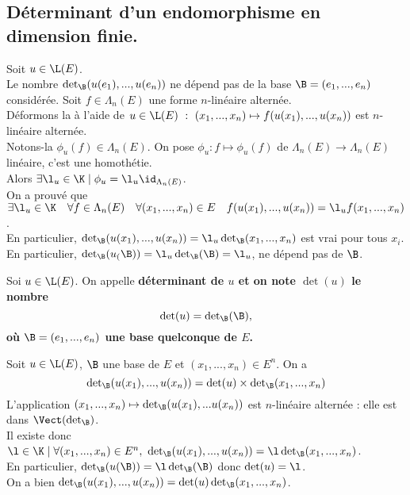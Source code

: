 \documentclass[11pt]{article}
\begin{document}
\subsection{Déterminant d'un endomorphisme en dimension finie.}

\begin{lemme}{}{}
    Soit $u\in\L(E)$.\\
    Le nombre $\det_\B(u(e_1),...,u(e_n))$ ne dépend pas de la base $\B=(e_1,...,e_n)$ considérée.
    \tcblower
    Soit $f\in\Lambda_n(E)$ une forme $n$-linéaire alternée.\\
    Déformons la à l'aide de $u\in\L(E)~:~(x_1,...,x_n)\mapsto f(u(x_1),...,u(x_n))$ est $n$-linéaire alternée.\\
    Notons-la $\phi_u(f)\in\Lambda_n(E)$. On pose $\phi_u:f\mapsto\phi_u(f)$ de $\Lambda_n(E) \to \Lambda_n(E)$ linéaire, c'est une homothétie.\\
    Alors $\exists \l_u\in\K\mid\phi_u=\l_u\id_{\Lambda_n(E)}$.\\
    On a prouvé que $\exists \l_u\in\K \quad \forall f \in \Lambda_n(E) \quad \forall (x_1,...,x_n)\in E \quad f(u(x_1),...,u(x_n))=\l_u f(x_1,...,x_n)$.\\
    En particulier, $\det_\B(u(x_1),...,u(x_n))=\l_u\det_\B(x_1,...,x_n)$ est vrai pour tous $x_i$.\\
    En particulier, $\det_\B(u_(\B))=\l_u\det_\B(\B)=\l_u$, ne dépend pas de $\B$.
\end{lemme}

\begin{defi}{}{}
    Soi $u\in\L(E)$. On appelle \bf{déterminant} de $u$ et on note $\det(u)$ le nombre
    \begin{equation*}
        \det(u)=\det\nolimits_\B(\B),
    \end{equation*}
    où $\B=(e_1,...,e_n)$ une base quelconque de $E$.
\end{defi}

\begin{prop}{}{}
    Soit $u\in\L(E)$, $\B$ une base de $E$ et $(x_1,...,x_n)\in E^n$. On a
    \begin{equation*}
        \det\nolimits_\B(u(x_1),...,u(x_n))=\det(u)\times\det\nolimits_\B(x_1,...,x_n)
    \end{equation*}
    \tcblower
    L'application $(x_1,...,x_n)\mapsto\det_\B(u(x_1),...u(x_n))$ est $n$-linéaire alternée : elle est dans $\Vect(\det_\B)$.\\
    Il existe donc $\l\in\K\mid\forall(x_1,...,x_n)\in E^n, ~ \det_\B(u(x_1),...,u(x_n))=\l\det_\B(x_1,...,x_n)$.\\
    En particulier, $\det_\B(u(\B))=\l\det_\B(\B)$ donc $\det(u)=\l$.\\
    On a bien $\det_\B(u(x_1),...,u(x_n))=\det(u)\det_\B(x_1,...,x_n)$.
\end{prop}
\end{document}
